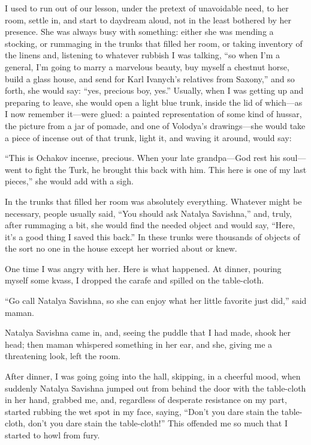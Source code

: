 I used to run out of our lesson, under the pretext of unavoidable need, to her room, settle in, and start to daydream aloud, not in the least bothered by her presence. She was always busy with something: either she was mending a stocking, or rummaging in the trunks that filled her room, or taking inventory of the linens and, listening to whatever rubbish I was talking, ``so when I'm a general, I'm going to marry a marvelous beauty, buy myself a chestnut horse, build a glass house, and send for Karl Ivanych's relatives from Saxony,'' and so forth, she would say: ``yes, precious boy, yes.'' Usually, when I was getting up and preparing to leave, she would open a light blue trunk, inside the lid of which---as I now remember it---were glued: a painted representation of some kind of hussar, the picture from a jar of pomade, and one of Volodya's drawings---she would take a piece of incense out of that trunk, light it, and waving it around, would say:

``This is Ochakov incense, precious. When your late grandpa---God rest his soul---went to fight the Turk, he brought this back with him. This here is one of my last pieces,'' she would add with a sigh. %

In the trunks that filled her room was absolutely everything. Whatever might be necessary, people usually said, ``You should ask Natalya Savishna,'' and, truly, after rummaging a bit, she would find the needed object and would say, ``Here, it's a good thing I saved this back.'' In these trunks were thousands of objects of the sort no one in the house except her worried about or knew. %

One time I was angry with her. Here is what happened. At dinner, pouring myself some kvass, I dropped the carafe and spilled on the table-cloth.

``Go call Natalya Savishna, so she can enjoy what her little favorite just did,'' said maman.

Natalya Savishna came in, and, seeing the puddle that I had made, shook her head; then maman whispered something in her ear, and she, giving me a threatening look, left the room.

After dinner, I was going going into the hall, skipping, in a cheerful mood, when suddenly Natalya Savishna jumped out from behind the door with the table-cloth in her hand, grabbed me, and, regardless of desperate resistance on my part, started rubbing the wet spot in my face, saying, ``Don't you dare stain the table-cloth, don't you dare stain the table-cloth!'' This offended me so much that I started to howl from fury. %

